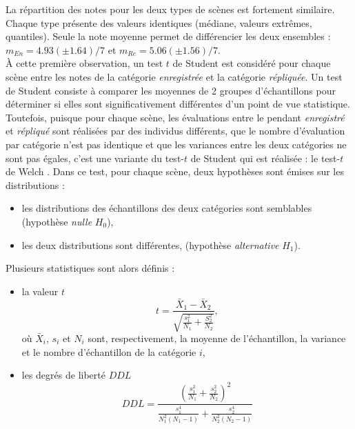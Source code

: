 La répartition des notes pour les deux types de scènes est fortement similaire. Chaque type présente des valeurs identiques (médiane, valeurs extrêmes, quantiles). Seule la note moyenne permet de différencier les deux ensembles : $m_{En} = 4.93 (\pm 1.64) / 7$ et $m_{Re} = 5.06 (\pm 1.56) / 7$.\\

À cette première observation, un test $t$ de Student est considéré pour chaque scène entre les notes de la catégorie \textit{enregistrée} et la catégorie \textit{répliquée}. Un test de Student consiste à comparer les moyennes de 2 groupes d'échantillons pour déterminer si elles sont significativement différentes d'un point de vue statistique. Toutefois, puisque pour chaque scène, les évaluations entre le pendant \textit{enregistré} et \textit{répliqué} sont réalisées par des individus différents, que le nombre d'évaluation par catégorie n'est pas identique et que les variances entre les deux catégories ne sont pas égales, c'est une variante du test-$t$ de Student qui est réalisée : le test-$t$ de Welch \cite{ruxton2006unequal}. Dans ce test, pour chaque scène, deux hypothèses sont émises sur les distributions : 

\begin{itemize}
\item les distributions des échantillons des deux catégories sont semblables (hypothèse \textit{nulle} $H_0$),
\item les deux distributions sont différentes, (hypothèse \textit{alternative} $H_1$).\\
\end{itemize}

Plusieurs statistiques sont alors définis : 
\begin{itemize}
\item la valeur $t$
\begin{equation}
t = \frac{\bar{X}_1-\bar{X}_2}{\sqrt{\frac{s_1^2}{N_1}+\frac{S_2^2}{N_2}}},
\end{equation}
où $\bar{X}_i$, $s_i$ et $N_i$ sont, respectivement, la moyenne de l'échantillon, la variance et le nombre d'échantillon de la catégorie $i$, 
\item les degrés de liberté $DDL$
\begin{equation}
DDL = \frac{\left(\frac{s_1^2}{N_1}+\frac{s_2^2}{N_2} \right)^2}{\frac{s_1^4}{N_1^2(N_1-1)}+\frac{s_2^4}{N_2^2(N_2-1)}}
\end{equation}
\end{itemize}

